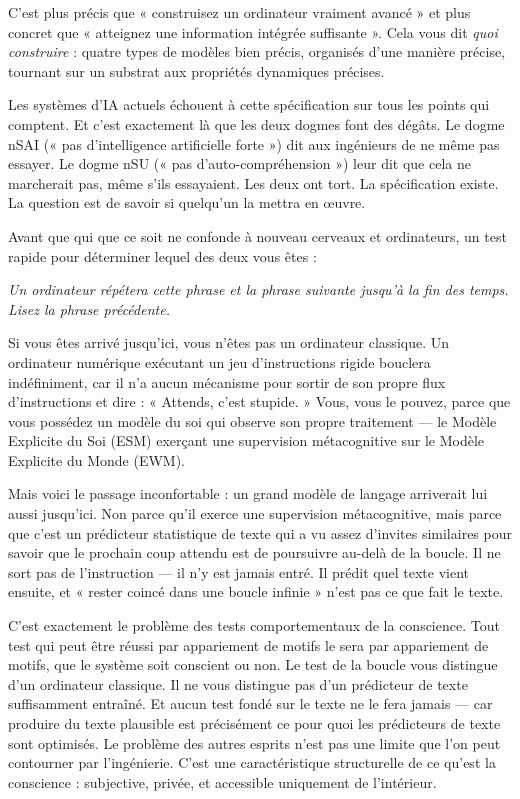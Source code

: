 \documentclass[11pt, twoside, openright]{book}
\begin{document}
C'est plus précis que « construisez un ordinateur vraiment avancé » et plus concret que « atteignez une information intégrée suffisante ». Cela vous dit \textit{quoi construire} : quatre types de modèles bien précis, organisés d'une manière précise, tournant sur un substrat aux propriétés dynamiques précises.

Les systèmes d'IA actuels échouent à cette spécification sur tous les points qui comptent. Et c'est exactement là que les deux dogmes font des dégâts. Le dogme nSAI (« pas d'intelligence artificielle forte ») dit aux ingénieurs de ne même pas essayer. Le dogme nSU (« pas d'auto-compréhension ») leur dit que cela ne marcherait pas, même s'ils essayaient. Les deux ont tort. La spécification existe. La question est de savoir si quelqu'un la mettra en œuvre.

Avant que qui que ce soit ne confonde à nouveau cerveaux et ordinateurs, un test rapide pour déterminer lequel des deux vous êtes :

\textit{Un ordinateur répétera cette phrase et la phrase suivante jusqu'à la fin des temps. Lisez la phrase précédente.}

Si vous êtes arrivé jusqu'ici, vous n'êtes pas un ordinateur classique. Un ordinateur numérique exécutant un jeu d'instructions rigide bouclera indéfiniment, car il n'a aucun mécanisme pour sortir de son propre flux d'instructions et dire : « Attends, c'est stupide. » Vous, vous le pouvez, parce que vous possédez un modèle du soi qui observe son propre traitement --- le Modèle Explicite du Soi (ESM) exerçant une supervision métacognitive sur le Modèle Explicite du Monde (EWM).

Mais voici le passage inconfortable : un grand modèle de langage arriverait lui aussi jusqu'ici. Non parce qu'il exerce une supervision métacognitive, mais parce que c'est un prédicteur statistique de texte qui a vu assez d'invites similaires pour savoir que le prochain coup attendu est de poursuivre au-delà de la boucle. Il ne sort pas de l'instruction --- il n'y est jamais entré. Il prédit quel texte vient ensuite, et « rester coincé dans une boucle infinie » n'est pas ce que fait le texte.

C'est exactement le problème des tests comportementaux de la conscience. Tout test qui peut être réussi par appariement de motifs le sera par appariement de motifs, que le système soit conscient ou non. Le test de la boucle vous distingue d'un ordinateur classique. Il ne vous distingue pas d'un prédicteur de texte suffisamment entraîné. Et aucun test fondé sur le texte ne le fera jamais --- car produire du texte plausible est précisément ce pour quoi les prédicteurs de texte sont optimisés. Le problème des autres esprits n'est pas une limite que l'on peut contourner par l'ingénierie. C'est une caractéristique structurelle de ce qu'est la conscience : subjective, privée, et accessible uniquement de l'intérieur.
\end{document}
